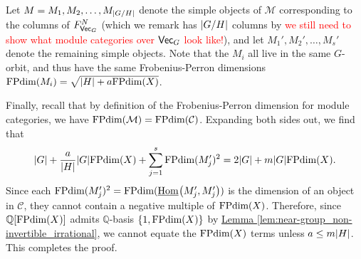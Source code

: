 \documentclass[12pt, reqno]{amsart}
\numberwithin{equation}{section}
\theoremstyle{plainspace}
\theoremstyle{definitionspace}
\theoremstyle{remarkspace}
\renewenvironment{proof}{{\noindent\textbf{Proof.}}}{\null\hfill\qedsymbol}
\DeclarePairedDelimiter{\abs}{\lvert}{\rvert}
\newcommand{\mathcat}[1]{\mathcal{#1}}
\newcommand{\IntHom}[2][]{
	\ifthenelse{\equal{#2}{}}
		{\underline{\textup{Hom}}_{#1}}
		{\underline{\textup{Hom}}_{#1}\!\left(#2\right)}
}
\newcommand{\textcat}[1]{\textup{\textsf{#1}}}
\newcommand{\FPdim}{\textup{FPdim}}
\begin{document}
\begin{proof}
\noindent Let $M = M_1, M_2, \dots, M_{\abs{G/H}}$ denote the simple objects of $\mathcat{M}$ corresponding to the columns of $F_{\textcat{Vec}_G}^N$ (which we remark has $\abs{G/H}$ columns by \textcolor{red}{we still need to show what module categories over $\textcat{Vec}_G$ look like!}), and let $M_1', M_2', \dots, M_s'$ denote the remaining simple objects. Note that the $M_i$ all live in the same $G$-orbit, and thus have the same Frobenius-Perron dimensions $\FPdim(M_i) = \sqrt{\abs{H} + a\FPdim(X)}$.
\newline

\noindent Finally, recall that by definition of the Frobenius-Perron dimension for module categories, we have $\FPdim(\mathcat{M}) = \FPdim(\mathcat{C})$. Expanding both sides out, we find that
\begin{align*}
\begin{split}
\abs{G} + \frac{a}{\abs{H}}\abs{G}\FPdim(X) + \sum_{j=1}^{s}{\FPdim(M_j')^2} = 2\abs{G} + m\abs{G}\FPdim(X).
\end{split}
\end{align*}
\noindent Since each $\FPdim(M_j')^2 = \FPdim(\IntHom{M_j', M_j'})$ is the dimension of an object in $\mathcat{C}$, they cannot contain a negative multiple of $\FPdim(X)$. Therefore, since $\mathbb{Q}[\FPdim(X)]$ admits $\mathbb{Q}$-basis $\{1, \FPdim(X)\}$ by \hyperref[lem:near-group_non-invertible_irrational]{Lemma \ref*{lem:near-group_non-invertible_irrational}}, we cannot equate the $\FPdim(X)$ terms unless $a \leq m\abs{H}$. This completes the proof.
\end{proof}
\newline
\end{document}
